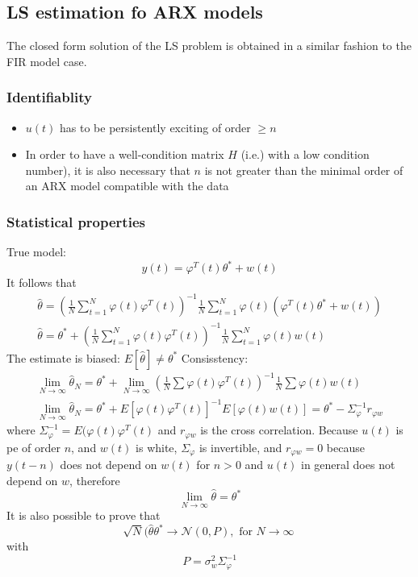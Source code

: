 \documentclass{book}
\begin{document}
\subsection{LS estimation fo ARX models}
The closed form solution of the LS problem is obtained in a similar fashion to the FIR model case.
\subsubsection{Identifiablity}
\begin{itemize}
    \item $u(t)$ has to be persistently exciting of order $\geq n$
    \item In order to have a well-condition matrix $H$ (i.e.) with a low condition number), it is also necessary that $n$ is not greater than the minimal order of an ARX model compatible with the data
\end{itemize}
\subsubsection{Statistical properties}
True model:
\[
    y(t)=\varphi^T(t)\theta^*+w(t)
\]
It follows that
\begin{gather*}
    \hat{\theta} =  \left(\frac{1}{N}\sum_{t=1}^{N}\varphi(t)\varphi^T(t)\right)^{-1} \frac{1}{N}\sum_{t=1}^{N}\varphi(t)\left(\varphi^T(t)\theta^*+w(t)\right)\\
    \hat{\theta} = \theta^* + \left(\frac{1}{N}\sum_{t=1}^{N}\varphi(t)\varphi^T(t)\right)^{-1} \frac{1}{N}\sum_{t=1}^{N}\varphi(t)w(t)
\end{gather*}
The estimate is biased: \( E[\hat{\theta}]\neq \theta^* \)
Consisstency:
\begin{gather*}
    \lim_{N\to\infty} \hat{\theta}_N = \theta^*+\lim_{N\to\infty}\left(\frac{1}{N}\sum \varphi(t)\varphi^T(t)\right)^{-1}\frac{1}{N}\sum \varphi(t)w(t)\\  
    \lim_{N\to\infty} \hat{\theta}_N=\theta^*+E[\varphi(t)\varphi^T(t)]^{-1}E[\varphi(t)w(t)]=\theta^*-\Sigma_{\varphi}^{-1}r_{\varphi w}
\end{gather*}
where $\Sigma_{\varphi}^{-1}=E(\varphi(t)\varphi^T(t)$ and $r_{\varphi w}$ is the cross correlation. 
Because $u(t)$ is pe of order $n$, and $w(t)$ is white, $\Sigma_{\varphi}$ is invertible, and $r_{\varphi w}=0$ because $y(t-n)$ does not depend on $w(t)$ for $n>0$ and $u(t)$ in general does not depend on $w$, therefore
\[
    \lim_{N\to\infty}\hat{\theta}=\theta^*
\]
It is also possible to prove that
\[
    \sqrt{N}(\hat{\theta}\theta^* \to \mathcal{N}(0,P), \text{ for } N\to\infty\
\]
with
\[
    P=\sigma_w^2\Sigma_{\varphi}^{-1}
\]
\end{document}
